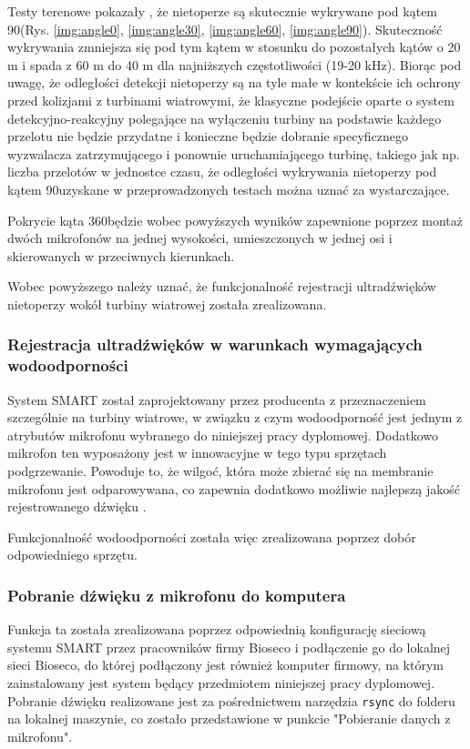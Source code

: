 \documentclass{sprz}
\begin{document}
Testy terenowe pokazały , że nietoperze są skutecznie wykrywane pod kątem 90\textdegree (Rys. \ref{img:angle0}, \ref{img:angle30}, \ref{img:angle60}, \ref{img:angle90}). Skuteczność wykrywania zmniejsza się pod tym kątem w stosunku do pozostałych kątów o 20 m i spada z 60 m do 40 m dla najniższych częstotliwości (19-20 kHz). Biorąc pod uwagę, że odległości detekcji nietoperzy są na tyle małe w kontekście ich ochrony przed kolizjami z turbinami wiatrowymi, że klasyczne podejście oparte o system detekcyjno-reakcyjny polegające
na wyłączeniu turbiny na podstawie każdego przelotu nie będzie przydatne i konieczne będzie dobranie specyficznego wyzwalacza zatrzymującego i ponownie uruchamiającego turbinę, takiego jak np. liczba przelotów w jednostce czasu, że odległości wykrywania nietoperzy pod kątem 90\textdegree uzyskane w przeprowadzonych testach można uznać za wystarczające. 

Pokrycie kąta 360\textdegree będzie wobec powyższych wyników zapewnione poprzez montaż dwóch mikrofonów na jednej wysokości, umieszczonych w jednej osi i skierowanych w przeciwnych kierunkach.

Wobec powyższego należy uznać, że funkcjonalność rejestracji ultradźwięków nietoperzy wokół turbiny wiatrowej została zrealizowana.


\subsubsection{Rejestracja ultradźwięków w warunkach wymagających wodoodporności}
System SMART został zaprojektowany przez producenta z przeznaczeniem szczególnie na turbiny wiatrowe, w związku z czym wodoodporność jest jednym z atrybutów mikrofonu wybranego do niniejszej pracy dyplomowej. Dodatkowo mikrofon ten wyposażony jest w innowacyjne w tego typu sprzętach podgrzewanie. Powoduje to, że wilgoć, która może zbierać się na membranie mikrofonu jest odparowywana, co zapewnia dodatkowo możliwie najlepszą jakość rejestrowanego dźwięku \cite{smart-user-guide}. 


Funkcjonalność wodoodporności została więc zrealizowana poprzez dobór odpowiedniego sprzętu.

\subsubsection{Pobranie dźwięku z mikrofonu do komputera}
Funkcja ta została zrealizowana poprzez odpowiednią konfigurację sieciową systemu SMART przez pracowników firmy Bioseco i podłączenie go do lokalnej sieci Bioseco, do której podłączony jest również komputer firmowy, na którym zainstalowany jest system będący przedmiotem niniejszej pracy dyplomowej. Pobranie dźwięku realizowane jest za pośrednictwem narzędzia \verb|rsync| do folderu na lokalnej maszynie, co zostało przedstawione w punkcie "Pobieranie danych z mikrofonu". 
\end{document}
